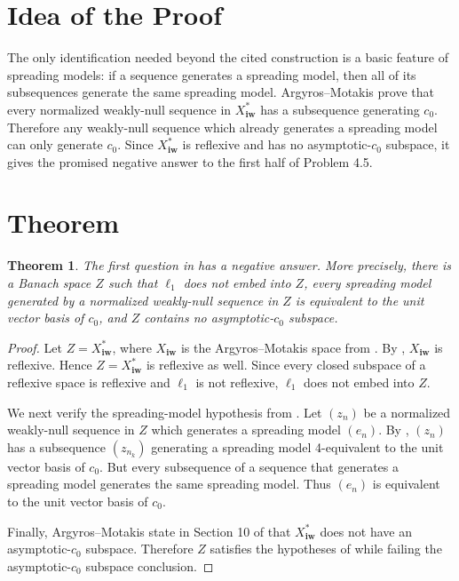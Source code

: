 \documentclass[11pt]{article}
\newtheorem{theorem}{Theorem}
\newcommand{\ellone}{\ell_1}
\newcommand{\cnull}{c_0}
\newcommand{\Xiw}{X_{\mathbf{iw}}}
\begin{document}
\section*{Idea of the Proof}

The only identification needed beyond the cited construction is a basic
feature of spreading models: if a sequence generates a spreading model, then
all of its subsequences generate the same spreading model. Argyros--Motakis
prove that every normalized weakly-null sequence in \(\Xiw^*\) has a subsequence
generating \(\cnull\). Therefore any weakly-null sequence which already
generates a spreading model can only generate \(\cnull\). Since \(\Xiw^*\) is
reflexive and has no asymptotic-\(\cnull\) subspace, it gives the promised
negative answer to the first half of Problem 4.5.

\section*{Theorem}

\begin{theorem}
The first question in \cite[Problem 4.5]{FOSZ} has a negative answer. More
precisely, there is a Banach space \(Z\) such that \(\ellone\) does not embed
into \(Z\), every spreading model generated by a normalized weakly-null
sequence in \(Z\) is equivalent to the unit vector basis of \(\cnull\), and
\(Z\) contains no asymptotic-\(\cnull\) subspace.
\end{theorem}

\begin{proof}
Let \(Z=\Xiw^*\), where \(\Xiw\) is the Argyros--Motakis space from
\cite{AM}. By \cite[Theorem A]{AM}, \(\Xiw\) is reflexive. Hence \(Z=\Xiw^*\)
is reflexive as well. Since every closed subspace of a reflexive space is
reflexive and \(\ellone\) is not reflexive, \(\ellone\) does not embed into
\(Z\).

We next verify the spreading-model hypothesis from \cite[Problem 4.5]{FOSZ}.
Let \((z_n)\) be a normalized weakly-null sequence in \(Z\) which generates a
spreading model \((e_n)\). By \cite[Theorem C(i)]{AM}, \((z_n)\) has a
subsequence \((z_{n_k})\) generating a spreading model 4-equivalent to the unit
vector basis of \(\cnull\). But every subsequence of a sequence that generates a
spreading model generates the same spreading model. Thus \((e_n)\) is
equivalent to the unit vector basis of \(\cnull\).

Finally, Argyros--Motakis state in Section 10 of \cite{AM} that
\(\Xiw^*\) does not have an asymptotic-\(\cnull\) subspace. Therefore \(Z\)
satisfies the hypotheses of \cite[Problem 4.5]{FOSZ} while failing the
asymptotic-\(\cnull\) subspace conclusion.
\end{proof}
\end{document}
